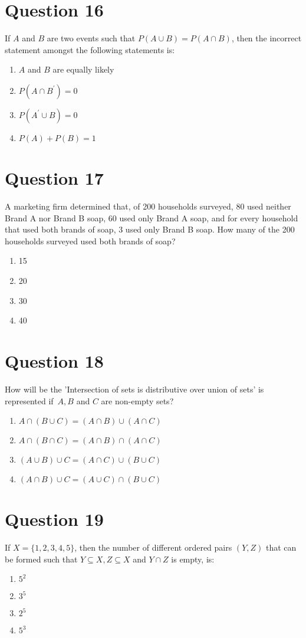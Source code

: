 \documentclass{article}
\begin{document}
\section*{Question 16}
If \(A\) and \(B\) are two events such that \(P(A \cup B)=P(A \cap B)\), then the incorrect statement amongst the following statements is:
\begin{enumerate}[label=(\alph*)]
\item \(A\) and \(B\) are equally likely
\item \(P\left(A \cap B^{\prime}\right)=0\)
\item \(P\left(A^{\prime} \cup B\right)=0\)
\item \(P(A)+P(B)=1\)
\end{enumerate}
\newpage
\section*{Question 17}
A marketing firm determined that, of 200 households surveyed, 80 used neither Brand A nor Brand B soap, 60 used only Brand A soap, and for every household that used both brands of soap, 3 used only Brand B soap. How many of the 200 households surveyed used both brands of soap?\newline
\begin{enumerate}[label=(\alph*)]
\item 15
\item 20
\item 30
\item 40
\end{enumerate}
\newpage
\section*{Question 18}
How will be the 'Intersection of sets is distributive over union of sets' is represented if \(A, B\) and \(C\) are non-empty sets?
\begin{enumerate}[label=(\alph*)]
\item \(A \cap(B \cup C)=(A \cap B) \cup(A \cap C)\)
\item \(A \cap(B \cap C)=(A \cap B) \cap(A \cap C)\)
\item \((A \cup B) \cup C=(A \cap C) \cup(B \cup C)\)
\item \((A \cap B) \cup C=(A \cup C) \cap(B \cup C)\)
\end{enumerate}
\newpage
\section*{Question 19}
If \(X=\{1,2,3,4,5\}\), then the number of different ordered pairs \((Y, Z)\) that can be formed such that \(Y \subseteq X, Z \subseteq X\) and \(Y \cap Z\) is empty, is:\newline
\begin{enumerate}[label=(\alph*)]
\item \(5^2\)
\item \(3^5\)
\item \(2^5\)
\item \(5^3\)
\end{enumerate}
\newpage
\end{document}
